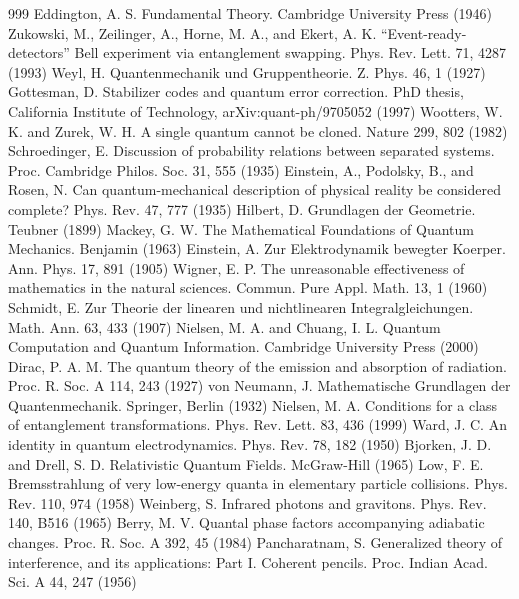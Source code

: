 \begin{thebibliography}{999}
 Eddington, A. S. Fundamental Theory. Cambridge University Press (1946)
 Zukowski, M., Zeilinger, A., Horne, M. A., and Ekert, A. K. ``Event-ready-detectors'' Bell experiment via entanglement swapping. Phys. Rev. Lett. 71, 4287 (1993)
 Weyl, H. Quantenmechanik und Gruppentheorie. Z. Phys. 46, 1 (1927)
 Gottesman, D. Stabilizer codes and quantum error correction. PhD thesis, California Institute of Technology, arXiv:quant-ph/9705052 (1997)
 Wootters, W. K. and Zurek, W. H. A single quantum cannot be cloned. Nature 299, 802 (1982)
 Schroedinger, E. Discussion of probability relations between separated systems. Proc. Cambridge Philos. Soc. 31, 555 (1935)
 Einstein, A., Podolsky, B., and Rosen, N. Can quantum-mechanical description of physical reality be considered complete? Phys. Rev. 47, 777 (1935)
 Hilbert, D. Grundlagen der Geometrie. Teubner (1899)
 Mackey, G. W. The Mathematical Foundations of Quantum Mechanics. Benjamin (1963)
 Einstein, A. Zur Elektrodynamik bewegter Koerper. Ann. Phys. 17, 891 (1905)
 Wigner, E. P. The unreasonable effectiveness of mathematics in the natural sciences. Commun. Pure Appl. Math. 13, 1 (1960)
 Schmidt, E. Zur Theorie der linearen und nichtlinearen Integralgleichungen. Math. Ann. 63, 433 (1907)
 Nielsen, M. A. and Chuang, I. L. Quantum Computation and Quantum Information. Cambridge University Press (2000)
 Dirac, P. A. M. The quantum theory of the emission and absorption of radiation. Proc. R. Soc. A 114, 243 (1927)
 von Neumann, J. Mathematische Grundlagen der Quantenmechanik. Springer, Berlin (1932)
 Nielsen, M. A. Conditions for a class of entanglement transformations. Phys. Rev. Lett. 83, 436 (1999)
 Ward, J. C. An identity in quantum electrodynamics. Phys. Rev. 78, 182 (1950)
 Bjorken, J. D. and Drell, S. D. Relativistic Quantum Fields. McGraw-Hill (1965)
 Low, F. E. Bremsstrahlung of very low-energy quanta in elementary particle collisions. Phys. Rev. 110, 974 (1958)
 Weinberg, S. Infrared photons and gravitons. Phys. Rev. 140, B516 (1965)
 Berry, M. V. Quantal phase factors accompanying adiabatic changes. Proc. R. Soc. A 392, 45 (1984)
 Pancharatnam, S. Generalized theory of interference, and its applications: Part I. Coherent pencils. Proc. Indian Acad. Sci. A 44, 247 (1956)

\end{thebibliography}
